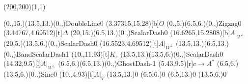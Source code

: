 \unitlength=1bp%

\begin{feynartspicture}(200,200)(1,1)

\FADiagram{}
\FAProp(0.,15.)(13.5,13.)(0.,){DoubleLine}{0}
\FALabel(3.37315,15.28)[b]{$O$}
\FAProp(0.,5.)(6.5,6.)(0.,){Zigzag}{0}
\FALabel(3.44767,4.69512)[t]{$\Delta$}
\FAProp(20,15.)(6.5,13.)(0.,){ScalarDash}{0}
\FALabel(16.6265,15.2808)[b]{$A|_{W^\perp}$}
\FAProp(20,5.)(13.5,6.)(0.,){ScalarDash}{0}
\FALabel(16.5523,4.69512)[t]{$A|_{W^\perp}$}
\FAProp(13.5,13.)(6.5,13.)(0.,){BandScalarDash}{1}
\FALabel(10.,11.93)[t]{$K_\varepsilon$}
\FAProp(13.5,13.)(13.5,6.)(0.,){ScalarDash}{0}
\FALabel(14.32,9.5)[l]{$A|_{W^\perp}$}
\FAProp(6.5,6.)(6.5,13.)(0.,){GhostDash}{-1}
\FALabel(5.43,9.5)[r]{$c\to A^*$}
\FAProp(6.5,6.)(13.5,6.)(0.,){Sine}{0}
\FALabel(10.,4.93)[t]{$A|_V$}
\FAVert(13.5,13.){0}
\FAVert(6.5,6.){0}
\FAVert(6.5,13.){0}
\FAVert(13.5,6.){0}
\end{feynartspicture}

